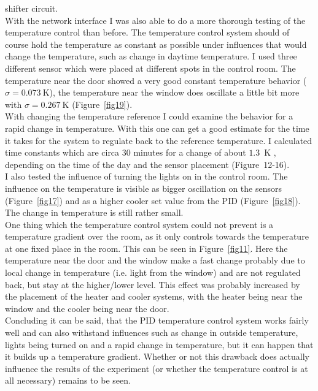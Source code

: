 \documentclass[12pt]{scrartcl}
\begin{document}
    shifter circuit.\\
    With the network interface I was also able to do a more thorough testing
    of the temperature control than before. The temperature control system
    should of course hold the temperature as constant as possible under
    influences that would change the temperature, such as change in daytime
    temperature. I used three different sensor which were placed at different
    spots in the control room. The temperature near the door showed a very
    good constant temperature behavior ($\sigma = 0.073~\text{K}$), the
    temperature near the window does oscillate a little bit more with
    $\sigma = 0.267~\text{K}$ (Figure~\ref{fig19}). \\
    With changing the temperature reference I could examine the behavior for a
    rapid change in temperature. With this one can get a good estimate for the
    time it takes for the system to regulate back to the reference temperature.
    I calculated time constants which are circa 30 minutes for a change of
    about $1.3$~K , depending on the time of the day and the sensor placement
    (Figure~12-16).\\
    I also tested the influence of turning the lights on in the control room.
    The influence on the temperature is visible as bigger oscillation on the
    sensors (Figure~\ref{fig17}) and as a higher cooler set value from the PID
    (Figure~\ref{fig18}). The change in temperature is still rather small.\\
    One thing which the temperature control system could not prevent is a temperature
    gradient over the room, as it only controls towards the temperature at one
    fixed place in the room. This can be seen in Figure~\ref{fig11}. Here the
    temperature near the door and the window make a fast change probably due to
    local change in temperature (i.e. light from the window) and are not regulated
    back, but stay at the higher/lower level. This effect was probably increased
    by the placement of the heater and cooler systems, with the heater being
    near the window and the cooler being near the door.\\
    Concluding it can be said, that the PID temperature control system works
    fairly well and can also withstand influences such as change in outside
    temperature, lights being turned on and a rapid change in temperature, but
    it can happen that it builds up a temperature gradient. Whether or not this
    drawback does actually influence the results of the experiment (or whether the temperature control is at all
    necessary) remains to be seen.
\end{document}

